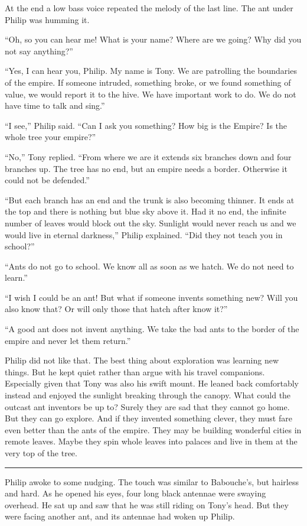 \documentclass[10pt, draft]{memoir}
\renewcommand{\pfbreakdisplay}{\bigskip \ding{166} \bigskip}
\newcommand{\secbreak}{\fancybreak{\pfbreakdisplay}}
\begin{document}
At the end a low bass voice repeated the melody of the last line. The ant under
Philip was humming it.

``Oh, so you can hear me! What is your name? Where are we going? Why did you
not say anything?''

``Yes, I can hear you, Philip. My name is Tony. We are patrolling the
boundaries of the empire. If someone intruded, something broke, or we found
something of value, we would report it to the hive. We have important work to
do. We do not have time to talk and sing.''

``I see,'' Philip said. ``Can I ask you something? How big is the Empire? Is
the whole tree your empire?''

``No,'' Tony replied. ``From where we are it extends six branches down and four
branches up. The tree has no end, but an empire needs a border. Otherwise it
could not be defended.''

``But each branch has an end and the trunk is also becoming thinner. It ends at
the top and there is nothing but blue sky above it. Had it no end, the infinite
number of leaves would block out the sky. Sunlight would never reach us and we
would live in eternal darkness,'' Philip explained. ``Did they not teach you in
school?''

``Ants do not go to school. We know all as soon as we hatch. We do not need to
learn.''

``I wish I could be an ant! But what if someone invents something new? Will you
also know that? Or will only those that hatch after know it?''

``A good ant does not invent anything. We take the bad ants to the border of
the empire and never let them return.''

Philip did not like that. The best thing about exploration was learning new
things. But he kept quiet rather than argue with his travel companions.
Especially given that Tony was also his swift mount. He leaned back comfortably
instead and enjoyed the sunlight breaking through the canopy. What could the
outcast ant inventors be up to? Surely they are sad that they cannot go home.
But they can go explore. And if they invented something clever, they must fare
even better than the ants of the empire. They may be building wonderful cities
in remote leaves. Maybe they spin whole leaves into palaces and live in them at
the very top of the tree.

\secbreak

Philip awoke to some nudging. The touch was similar to Babouche's, but hairless
and hard. As he opened his eyes, four long black antennae were swaying
overhead. He sat up and saw that he was still riding on Tony's head. But they
were facing another ant, and its antennae had woken up Philip.
\end{document}
